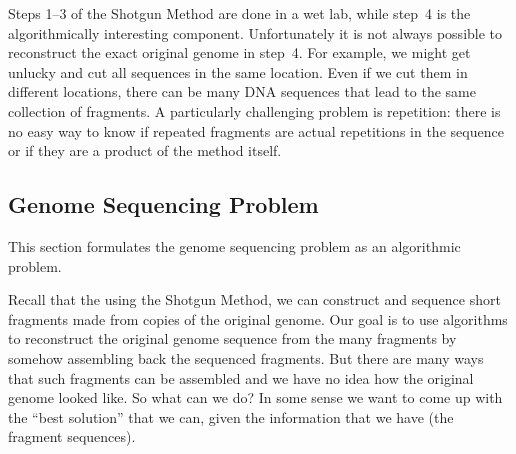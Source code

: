 \begin{cluster}
\label{grp:rmrk:genome::steps}

\begin{remark}
\label{rmrk:genome::steps}
Steps 1--3 of the Shotgun Method are done in a wet lab, while step~4
is the algorithmically interesting component.
Unfortunately it is not always possible to reconstruct the exact
original genome in step~4. 
For example, we might get unlucky and cut all sequences in the same
location.  
Even if we cut them in different locations, there can be many DNA
sequences that lead to the same collection of fragments. 
A particularly challenging problem is repetition: there is no easy way
to know if repeated fragments are actual repetitions in the sequence
or if they are a product of the method itself.

\end{remark}
\end{cluster}


\subsection{Genome Sequencing Problem}
\label{sec:genome::genome-sequencing-problem}

\begin{cluster}
\label{grp:grm:genome::formulates}

\begin{gram}
\label{grm:genome::formulates}
This section formulates the genome sequencing problem as an
algorithmic problem.

\end{gram}
\end{cluster}

\begin{cluster}
\label{grp:grm:genome::recall}

\begin{gram}
\label{grm:genome::recall}
Recall that the using the Shotgun Method, we can construct and sequence
short fragments made from copies of the original genome. 
Our goal is to use algorithms to reconstruct the original genome
sequence from the many fragments by somehow assembling back the
sequenced fragments.
But there are many ways that such fragments can be assembled and we
have no idea how the original genome looked like.  So what can we do?
In some sense we want to come up with the ``best solution'' that we
can, given the information that we have (the fragment sequences).

\end{gram}
\end{cluster}


